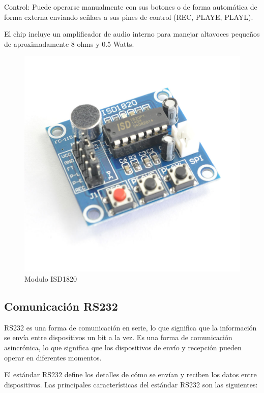 Control: Puede operarse manualmente con sus botones o de forma automática de forma externa enviando señlaes a sus pines de control (REC, PLAYE, PLAYL).

El chip incluye un amplificador de audio interno para manejar altavoces pequeños de aproximadamente 8 ohms y 0.5 Watts.

\begin{figure}[H]
    \centering
    \includegraphics[width=0.5\linewidth]{imagenes/Modulo de voz.png}
    \caption{Modulo ISD1820}
    \label{fig:Voz}
\end{figure}

\subsection*{Comunicación RS232}

RS232 es una forma de comunicación en serie, lo que significa que la información se envía entre dispositivos un bit a la vez. Es una forma de comunicación asincrónica, lo que significa que los dispositivos de envío y recepción pueden operar en diferentes momentos.

El estándar RS232 define los detalles de cómo se envían y reciben los datos entre dispositivos. Las principales características del estándar RS232 son las siguientes:

